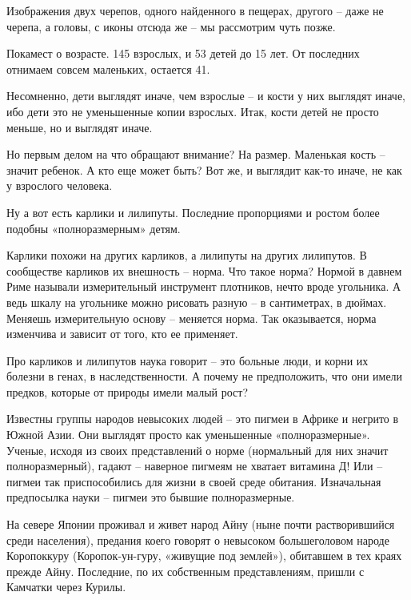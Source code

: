 Изображения двух черепов, одного найденного в пещерах, другого – даже не черепа, а головы, с иконы отсюда же – мы рассмотрим чуть позже.

Покамест о возрасте. 145 взрослых, и 53 детей до 15 лет. От последних отнимаем совсем маленьких, остается 41.

Несомненно, дети выглядят иначе, чем взрослые – и кости у них выглядят иначе, ибо дети это не уменьшенные копии взрослых. Итак, кости детей не просто меньше, но и выглядят иначе.

Но первым делом на что обращают внимание? На размер. Маленькая кость – значит ребенок. А кто еще может быть? Вот же, и выглядит как-то иначе, не как у взрослого человека.

Ну а вот есть карлики и лилипуты. Последние пропорциями и ростом более подобны «полноразмерным» детям.


Карлики похожи на других карликов, а лилипуты на других лилипутов. В сообществе карликов их внешность – норма. Что такое норма? Нормой в давнем Риме называли измерительный инструмент плотников, нечто вроде угольника. А ведь шкалу на угольнике можно рисовать разную – в сантиметрах, в дюймах. Меняешь измерительную основу – меняется норма. Так оказывается, норма изменчива и зависит от того, кто ее применяет.

Про карликов и лилипутов наука говорит – это больные люди, и корни их болезни в генах, в наследственности. А почему не предположить, что они имели предков, которые от природы имели малый рост?

Известны группы народов невысоких людей – это пигмеи в Африке и негрито в Южной Азии. Они выглядят просто как уменьшенные «полноразмерные». Ученые, исходя из своих представлений о норме (нормальный для них значит полноразмерный), гадают – наверное пигмеям не хватает витамина Д! Или – пигмеи так приспособились для жизни в своей среде обитания. Изначальная предпосылка науки – пигмеи это бывшие полноразмерные.

На севере Японии проживал и живет народ Айну (ныне почти растворившийся среди населения), предания коего говорят о невысоком большеголовом народе Коропоккуру (Коропок-ун-гуру, «живущие под землей»), обитавшем в тех краях прежде Айну. Последние, по их собственным представлениям, пришли с Камчатки через Курилы.

